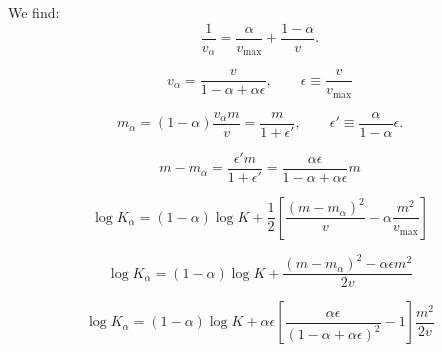 \documentclass{article}
\begin{document}
We find:
$$
\frac{1}{v_\alpha}
=
\frac{\alpha}{v_{\text{max}}}
+ \frac{1-\alpha}{v}.
$$

$$
v_\alpha = \frac{v}{1-\alpha + \alpha \epsilon},
\qquad
\epsilon \equiv \frac{v}{v_{\text{max}}}
$$

$$
m_\alpha = (1-\alpha)\frac{v_\alpha m}{v}
= \frac{m}{1 + \epsilon'},
\qquad
\epsilon' \equiv \frac{\alpha}{1-\alpha} \epsilon.
$$

$$
m-m_\alpha = \frac{\epsilon' m}{1+\epsilon'}
= \frac{\alpha\epsilon}{1-\alpha+\alpha\epsilon}m
$$

$$
\log K_\alpha
= (1-\alpha)\log K + \frac{1}{2}
\left[
\frac{(m-m_\alpha)^2}{v} - \alpha \frac{m^2}{v_{\text{max}}}
\right]
$$

$$
\log K_\alpha
= (1-\alpha)\log K + 
\frac{(m-m_\alpha)^2 - \alpha \epsilon m^2}{2v} 
$$

$$
\log K_\alpha
= (1-\alpha)\log K + 
\alpha\epsilon
\left[\frac{\alpha\epsilon}{(1-\alpha + \alpha\epsilon)^2}-1
\right]
\frac{m^2}{2v} 
$$








\end{document}
